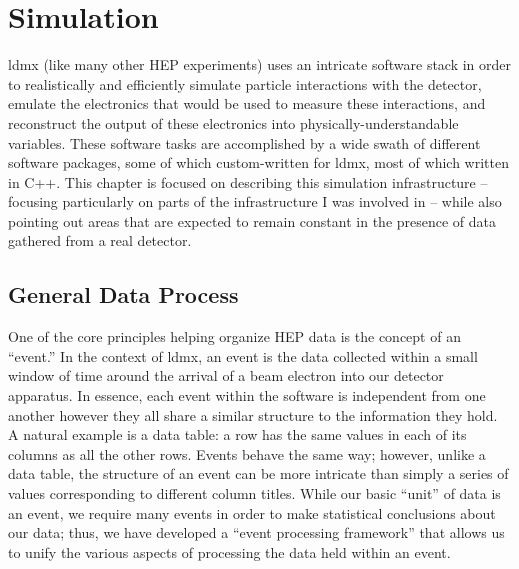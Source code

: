 \chapter{Simulation}
\label{chapter:ldmx:simulation}

\ac{ldmx} (like many other HEP experiments) uses an intricate software stack in order to realistically and efficiently simulate particle interactions with the detector, emulate the electronics that would be used to measure these interactions, and reconstruct the output of these electronics into physically-understandable variables.
These software tasks are accomplished by a wide swath of different software packages, some of which custom-written for \ac{ldmx}, most of which written in C++.
This chapter is focused on describing this simulation infrastructure -- focusing particularly on parts of the infrastructure I was involved in -- while also pointing out areas that are expected to remain constant in the presence of data gathered from a real detector.

\section{General Data Process}
One of the core principles helping organize HEP data is the concept of an ``event.''
In the context of \ac{ldmx}, an event is the data collected within a small window of time around the arrival of a beam electron into our detector apparatus.
In essence, each event within the software is independent from one another however they all share a similar structure to the information they hold. A natural example is a data table: a row has the same values in each of its columns as all the other rows. Events behave the same way; however, unlike a data table, the structure of an event can be more intricate than simply a series of values corresponding to different column titles.
While our basic ``unit'' of data is an event, we require many events in order to make statistical conclusions about our data; thus, we have developed a ``event processing framework'' that allows us to unify the various aspects of processing the data held within an event.

